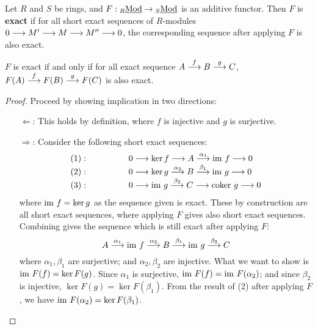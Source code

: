 \documentclass{article}
\begin{document}

\begin{definition}
    Let $R$ and $S$ be rings, and $F: {}_{R}\underline{\textup{Mod}} \to {}_{S}\underline{\textup{Mod}}$ is an additive functor. Then $F$ is \textbf{exact} if for all short exact sequences of $R$-modules $0 \longrightarrow M' \longrightarrow M \longrightarrow M'' \longrightarrow 0$, the corresponding sequence after applying $F$ is also exact.
\end{definition}

\begin{proposition}\label{prop:tensor product functor right exact}
    $F$ is exact if and only if for all exact sequence $A \overset{f}{\longrightarrow} B \overset{g}{\longrightarrow} C$, $F(A) \overset{f}{\longrightarrow} F(B) \overset{g}{\longrightarrow} F(C)$ is also exact.
\end{proposition}

\begin{proof}
    Proceed by showing implication in two directions:
    \begin{itemize}
        \item[$\Leftarrow$:] This holds by definition, where $f$ is injective and $g$ is surjective.
        \item[$\Rightarrow$:] Consider the following short exact sequences:
        \[
        \begin{array}{ll}
            (1):\qquad\qquad & 0 \longrightarrow \ker f \longrightarrow A \overset{\alpha_1}{\longrightarrow} \mathrm{im}\  f \longrightarrow 0 \\
            (2):\qquad\qquad & 0 \longrightarrow \ker g \overset{\alpha_2}{\longrightarrow} B \overset{\beta_1}{\longrightarrow} \mathrm{im}\  g \longrightarrow 0 \\
            (3):\qquad\qquad & 0 \longrightarrow \mathrm{im}\  g \overset{\beta_2}{\longrightarrow} C \longrightarrow \mathrm{coker}\  g \longrightarrow 0
        \end{array}
        \]
        where $\mathrm{im}\  f = \ker g$ as the sequence given is exact. These by construction are all short exact sequences, where applying $F$ gives also short exact sequences. Combining gives the sequence which is still exact after applying $F$:
        \[
            A \overset{\alpha_1}{\longrightarrow} \mathrm{im}\  f \overset{\alpha_2}{\longrightarrow} B \overset{\beta_1}{\longrightarrow} \mathrm{im}\  g \overset{\beta_2}{\longrightarrow} C
        \]
        where $\alpha_1, \beta_1$ are surjective; and $\alpha_2, \beta_2$ are injective. What we want to show is $\mathrm{im}\  F(f) = \ker F(g)$. Since $\alpha_1$ is surjective, $\mathrm{im}\  F(f) = \mathrm{im}\  F(\alpha_2)$; and since $\beta_2$ is injective, $\ker F(g) = \ker F(\beta_1)$. From the result of (2) after applying $F$, we have $\mathrm{im}\  F(\alpha_2) = \ker F(\beta_1)$.
    \end{itemize}
\end{proof}
\end{document}
